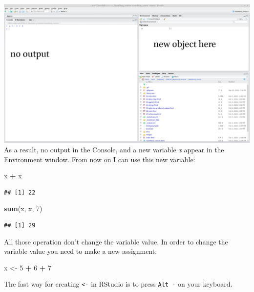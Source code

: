 \documentclass[
]{book}
\newenvironment{Shaded}{\begin{snugshade}}{\end{snugshade}}
\newcommand{\DecValTok}[1]{\textcolor[rgb]{0.00,0.00,0.81}{#1}}
\newcommand{\KeywordTok}[1]{\textcolor[rgb]{0.13,0.29,0.53}{\textbf{#1}}}
\newcommand{\NormalTok}[1]{#1}
\newcommand{\OperatorTok}[1]{\textcolor[rgb]{0.81,0.36,0.00}{\textbf{#1}}}
\newcommand{\StringTok}[1]{\textcolor[rgb]{0.31,0.60,0.02}{#1}}
\begin{document}
\includegraphics{images/01.04.variable.png}
As a result, no output in the Console, and a new variable \emph{x} appear in the Environment window. From now on I can use this new variable:

\begin{Shaded}
\begin{Highlighting}[]
\NormalTok{x }\OperatorTok{+}\StringTok{ }\NormalTok{x}
\end{Highlighting}
\end{Shaded}

\begin{verbatim}
## [1] 22
\end{verbatim}

\begin{Shaded}
\begin{Highlighting}[]
\KeywordTok{sum}\NormalTok{(x, x, }\DecValTok{7}\NormalTok{)}
\end{Highlighting}
\end{Shaded}

\begin{verbatim}
## [1] 29
\end{verbatim}

All those operation don't change the variable value. In order to change the variable value you need to make a new assignment:

\begin{Shaded}
\begin{Highlighting}[]
\NormalTok{x <-}\StringTok{ }\DecValTok{5} \OperatorTok{+}\StringTok{ }\DecValTok{6} \OperatorTok{+}\StringTok{ }\DecValTok{7}
\end{Highlighting}
\end{Shaded}

The fast way for creating \texttt{\textless{}-} in RStudio is to press \texttt{Alt\ -} on your keyboard.
\end{document}
